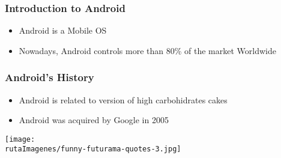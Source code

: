 

\begin{frame}
\frametitle{Introduction to Android}
\begin{itemize}
\item Android is a Mobile OS
\item Nowadays, Android controls more than 80\% of the market Worldwide
\end{itemize}

\end{frame}



\begin{frame}
\frametitle{Android's History}
\begin{itemize}
\item Android is related to version of high carbohidrates cakes
\item Android was acquired by Google in 2005
\end{itemize}

\begin{center}
\texttt{[image: \\rutaImagenes/funny-futurama-quotes-3.jpg]}
\end{center}


\end{frame}

